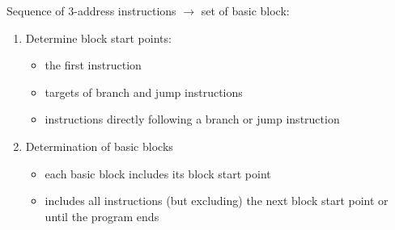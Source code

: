 Sequence of 3-address instructions $\rightarrow$ set of basic block:
\begin{enumerate}
  \item Determine block start points:
\begin{itemize}
	\item the first instruction
	\item targets of branch and jump instructions
	\item instructions directly following a branch or jump instruction
\end{itemize}
\item Determination of basic blocks
\begin{itemize}
	\item each basic block includes its block start point
	\item includes all instructions (but excluding) the next block start point or until the program ends
\end{itemize}

\end{enumerate}

